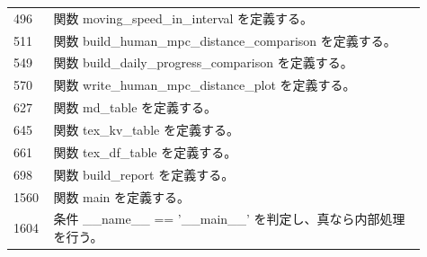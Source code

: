 \documentclass[a4paper,11pt]{article}
\begin{document}
\begin{longtable}{p{0.07\linewidth} p{0.84\linewidth}}
496 & 関数 moving\_speed\_in\_interval を定義する。 \\
511 & 関数 build\_human\_mpc\_distance\_comparison を定義する。 \\
549 & 関数 build\_daily\_progress\_comparison を定義する。 \\
570 & 関数 write\_human\_mpc\_distance\_plot を定義する。 \\
627 & 関数 md\_table を定義する。 \\
645 & 関数 tex\_kv\_table を定義する。 \\
661 & 関数 tex\_df\_table を定義する。 \\
698 & 関数 build\_report を定義する。 \\
1560 & 関数 main を定義する。 \\
1604 & 条件 \_\_name\_\_ == '\_\_main\_\_' を判定し、真なら内部処理を行う。 \\
            \bottomrule
            \end{longtable}
\end{document}
